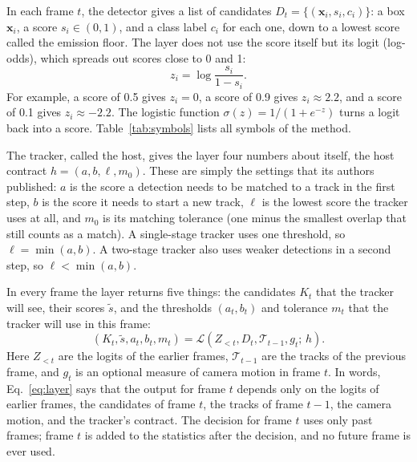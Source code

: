 \documentclass[pdflatex,sn-mathphys-num,iicol]{sn-jnl}
\makeatletter
\def\subsectionfont{\reset@font\fontfamily{\rmdefault}\fontsize{10bp}{12bp}\bfseries\selectfont\raggedright\boldmath}
\renewcommand\subsection{\@startsection{subsection}{2}{\z@}{-7pt \@plus -2pt \@minus -2pt}{3pt}{\subsectionfont}}
\makeatother
\begin{document}
\subsection{Inputs and outputs}\label{sec:problem}
In each frame $t$, the detector gives a list of candidates
$D_t=\{(\mathbf{x}_i,s_i,c_i)\}$: a box $\mathbf{x}_i$, a score
$s_i\in(0,1)$, and a class label $c_i$ for each one, down to a lowest score
called the emission floor. The layer does not use the score itself but its
logit (log-odds), which spreads out scores close to 0 and 1:
\begin{equation}
z_i=\log\frac{s_i}{1-s_i}.
\label{eq:logit}
\end{equation}
For example, a score of 0.5 gives $z_i=0$, a score of 0.9 gives
$z_i\approx2.2$, and a score of 0.1 gives $z_i\approx-2.2$. The logistic
function $\sigma(z)=1/(1+e^{-z})$ turns a logit back into a score. Table~\ref{tab:symbols}
lists all symbols of the method.

The tracker, called the host, gives the layer four numbers about itself, the
host contract $h=(a,b,\ell,m_0)$. These are simply the settings that its
authors published: $a$ is the score a detection needs to be matched to a
track in the first step, $b$ is the score it needs to start a new track,
$\ell$ is the lowest score the tracker uses at all, and $m_0$ is its matching
tolerance (one minus the smallest overlap that still counts as a match). A
single-stage tracker uses one threshold, so $\ell=\min(a,b)$. A two-stage
tracker also uses weaker detections in a second step, so
$\ell<\min(a,b)$.

In every frame the layer returns five things: the candidates $K_t$ that the
tracker will see, their scores $\tilde{s}$, and the thresholds $(a_t,b_t)$
and tolerance $m_t$ that the tracker will use in this frame:
\begin{equation}
\left(K_t,\tilde{s},a_t,b_t,m_t\right)=
\mathcal{L}\left(Z_{<t},D_t,\mathcal{T}_{t-1},g_t;\,h\right).
\label{eq:layer}
\end{equation}
Here $Z_{<t}$ are the logits of the earlier frames, $\mathcal{T}_{t-1}$ are
the tracks of the previous frame, and $g_t$ is an optional measure of camera
motion in frame $t$. In words, Eq.~\eqref{eq:layer} says that the output for
frame $t$ depends only on the logits of earlier frames, the candidates of
frame $t$, the tracks of frame $t-1$, the camera motion, and the tracker's
contract. The decision for frame $t$ uses only past frames; frame $t$ is
added to the statistics after the decision, and no future frame is ever
used.
\end{document}
